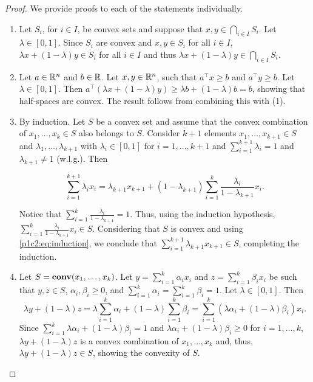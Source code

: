 \begin{proof}
	We provide proofs to each of the statements individually. 
	\begin{enumerate}
	 \item Let 	$S_i$, for $i \in I$, be convex sets and suppose that $x, y \in \bigcap_{i \in I} S_i$. Let $\lambda \in [0,1]$. Since $S_i$ are convex and $x,y \in S_i$ for all $i \in I$, $\lambda x + (1-\lambda) y \in S_i$ for all $i \in I$ and thus $\lambda x + (1-\lambda) y \in \bigcap_{i \in I} S_i$.
	
	\item Let $a \in \mathbb{R}^n$ and $b \in \mathbb{R}$. Let $x,y \in \mathbb{R}^n$, such that $a^\top x \geq b$ and $a^\top y \geq b$. Let $\lambda \in [0,1]$. Then $a^\top (\lambda x + (1-\lambda)y) \geq \lambda b + (1-\lambda)b = b$, showing that half-spaces are convex. The result follows from combining this with (1).    
	
	\item By induction. Let $S$ be a convex set and assume that the convex combination of $x_1, \dots, x_k \in S$ also belongs to $S$. Consider $k+1$ elements $x_1, \dots, x_{k+1} \in S$ and $\lambda_1, \dots, \lambda_{k+1}$ with $\lambda_i \in [0,1]$ for $i = 1,\dots, k+1$ and $\sum_{i=1}^{k+1}\lambda_i = 1$ and $\lambda_{k+1} \neq 1$ (w.l.g.). Then

	\begin{equation}
		\sum_{i=1}^{k+1}\lambda_i x_i = \lambda_{k+1}x_{k+1} + (1 - \lambda_{k+1}) \sum_{i=1}^k \frac{\lambda_i}{1 - \lambda_{k+1}}x_i. \label{p1c2:eq:induction}
	\end{equation}								

		Notice that $\sum_{i=1}^{k}\frac{\lambda_i}{1 - \lambda_{k+1}} = 1$. Thus, using the induction hypothesis, $\sum_{i=1}^{k}\frac{\lambda_i}{1 - \lambda_{k+1}}x_i \in S$. Considering that $S$ is convex and using \eqref{p1c2:eq:induction}, we conclude that $\sum_{i=1}^{k+1}\lambda_{k+1}x_{k+1} \in S$, completing the induction.
		
	\item Let $S = \mathop{\bf conv}(x_1, \dots, x_k)$. Let $y = \sum_{i=1}^k \alpha_i x_i$ and $z = \sum_{i=1}^k \beta_ix_i$ be such that $y,z \in S$, $\alpha_i,\beta_i \geq 0$, and $\sum_{i=1}^k \alpha_i = \sum_{i=1}^k \beta_i = 1$. Let $\lambda \in [0,1]$. Then
		\begin{equation}
			\lambda y + (1- \lambda)z = \lambda\sum_{i=1}^k \alpha_i + (1-\lambda)\sum_{i=1}^k \beta_i = \sum_{i=1}^k (\lambda \alpha_i + (1-\lambda) \beta_i)x_i. 	
		\end{equation}
		Since $\sum_{i=1}^k \lambda \alpha_i + (1-\lambda) \beta_i = 1$ and $\lambda \alpha_i + (1-\lambda) \beta_i \geq 0$ for $i=1,\dots,k$, $\lambda y + (1- \lambda)z$ is a convex combination of $x_1, \dots, x_k$ and, thus, $\lambda y + (1- \lambda)z \in S$, showing the convexity of $S$. \qedhere	
	\end{enumerate}	
\end{proof}

